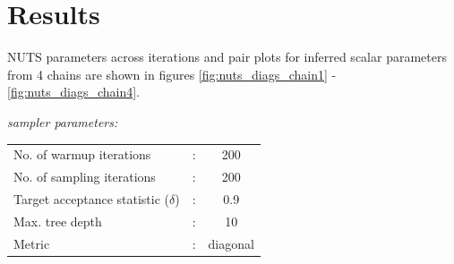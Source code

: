 \documentclass[12pt]{article}
\begin{document}
 \section*{Results}
 NUTS parameters across iterations and pair plots for inferred scalar parameters from 4 chains are shown in figures \ref{fig:nuts_diags_chain1} - \ref{fig:nuts_diags_chain4}.

 \textit{sampler parameters:}
 
 \begin{tabular}{lcc}
   No. of warmup iterations & : & 200 \\
   No. of sampling iterations & : & 200 \\
   Target acceptance statistic ($\delta$) & : & 0.9 \\
   Max. tree depth & : & 10 \\
   Metric & : & diagonal \\
 \end{tabular}
\end{document}
